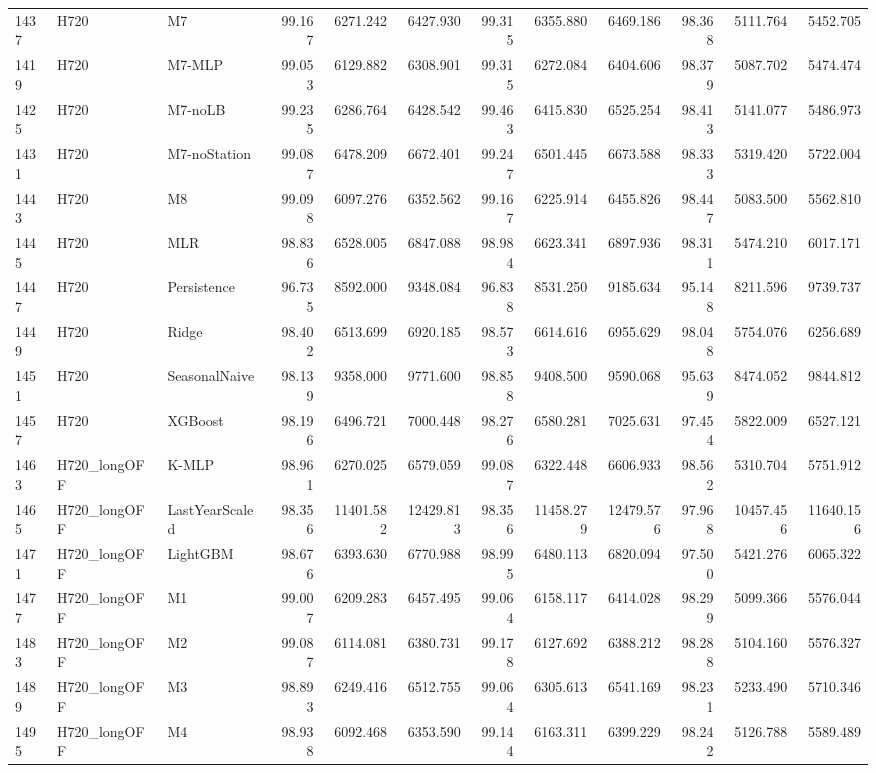 \begin{tabular}{lllrrrrrrrrr}
1437 & H720 & M7 & 99.167 & 6271.242 & 6427.930 & 99.315 & 6355.880 & 6469.186 & 98.368 & 5111.764 & 5452.705 \\
1419 & H720 & M7-MLP & 99.053 & 6129.882 & 6308.901 & 99.315 & 6272.084 & 6404.606 & 98.379 & 5087.702 & 5474.474 \\
1425 & H720 & M7-noLB & 99.235 & 6286.764 & 6428.542 & 99.463 & 6415.830 & 6525.254 & 98.413 & 5141.077 & 5486.973 \\
1431 & H720 & M7-noStation & 99.087 & 6478.209 & 6672.401 & 99.247 & 6501.445 & 6673.588 & 98.333 & 5319.420 & 5722.004 \\
1443 & H720 & M8 & 99.098 & 6097.276 & 6352.562 & 99.167 & 6225.914 & 6455.826 & 98.447 & 5083.500 & 5562.810 \\
1445 & H720 & MLR & 98.836 & 6528.005 & 6847.088 & 98.984 & 6623.341 & 6897.936 & 98.311 & 5474.210 & 6017.171 \\
1447 & H720 & Persistence & 96.735 & 8592.000 & 9348.084 & 96.838 & 8531.250 & 9185.634 & 95.148 & 8211.596 & 9739.737 \\
1449 & H720 & Ridge & 98.402 & 6513.699 & 6920.185 & 98.573 & 6614.616 & 6955.629 & 98.048 & 5754.076 & 6256.689 \\
1451 & H720 & SeasonalNaive & 98.139 & 9358.000 & 9771.600 & 98.858 & 9408.500 & 9590.068 & 95.639 & 8474.052 & 9844.812 \\
1457 & H720 & XGBoost & 98.196 & 6496.721 & 7000.448 & 98.276 & 6580.281 & 7025.631 & 97.454 & 5822.009 & 6527.121 \\
1463 & H720_longOFF & K-MLP & 98.961 & 6270.025 & 6579.059 & 99.087 & 6322.448 & 6606.933 & 98.562 & 5310.704 & 5751.912 \\
1465 & H720_longOFF & LastYearScaled & 98.356 & 11401.582 & 12429.813 & 98.356 & 11458.279 & 12479.576 & 97.968 & 10457.456 & 11640.156 \\
1471 & H720_longOFF & LightGBM & 98.676 & 6393.630 & 6770.988 & 98.995 & 6480.113 & 6820.094 & 97.500 & 5421.276 & 6065.322 \\
1477 & H720_longOFF & M1 & 99.007 & 6209.283 & 6457.495 & 99.064 & 6158.117 & 6414.028 & 98.299 & 5099.366 & 5576.044 \\
1483 & H720_longOFF & M2 & 99.087 & 6114.081 & 6380.731 & 99.178 & 6127.692 & 6388.212 & 98.288 & 5104.160 & 5576.327 \\
1489 & H720_longOFF & M3 & 98.893 & 6249.416 & 6512.755 & 99.064 & 6305.613 & 6541.169 & 98.231 & 5233.490 & 5710.346 \\
1495 & H720_longOFF & M4 & 98.938 & 6092.468 & 6353.590 & 99.144 & 6163.311 & 6399.229 & 98.242 & 5126.788 & 5589.489 \\

\end{tabular}
